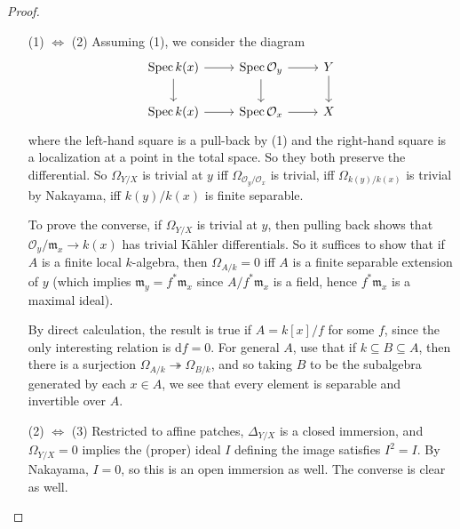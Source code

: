 \documentclass{shortart}
\theoremstyle{definition}
\DeclareMathOperator\Spec{Spec}
\begin{document}
\begin{proof}\leavevmode
  \begin{itemize}[leftmargin=2cm]
    \item [(1) $\Leftrightarrow$ (2)] Assuming (1), we consider the diagram
      \[
        \begin{tikzcd}
          \Spec k(x) \ar[d] \ar[r] & \Spec \mathcal{O}_y \ar[r] \ar[d] & Y\ar[d] \\
          \Spec k(x) \ar[r] & \Spec \mathcal{O}_x \ar[r] & X
        \end{tikzcd}
      \]
      where the left-hand square is a pull-back by (1) and the right-hand square is a localization at a point in the total space. So they both preserve the differential. So $\Omega_{Y/X}$ is trivial at $y$ iff $\Omega_{\mathcal{O}_y/\mathcal{O}_x}$ is trivial, iff $\Omega_{k(y)/k(x)}$ is trivial by Nakayama, iff $k(y)/k(x)$ is finite separable.

      To prove the converse, if $\Omega_{Y/X}$ is trivial at $y$, then pulling back shows that $\mathcal{O}_y/\mathfrak{m}_x \to k(x)$ has trivial K\"ahler differentials. So it suffices to show that if $A$ is a finite local $k$-algebra, then $\Omega_{A/k} = 0$ iff $A$ is a finite separable extension of $y$ (which implies $\mathfrak{m}_y = f^* \mathfrak{m}_x$ since $A/f^*\mathfrak{m}_x$ is a field, hence $f^*\mathfrak{m}_x$ is a maximal ideal).
     
      By direct calculation, the result is true if $A = k[x]/f$ for some $f$, since the only interesting relation is $\mathrm{d} f = 0$. For general $A$, use that if $k \subseteq B \subseteq A$, then there is a surjection $\Omega_{A/k} \twoheadrightarrow \Omega_{B/k}$, and so taking $B$ to be the subalgebra generated by each $x \in A$, we see that every element is separable and invertible over $A$.

    \item [(2) $\Leftrightarrow$ (3)] Restricted to affine patches, $\Delta_{Y/X}$ is a closed immersion, and $\Omega_{Y/X} = 0$ implies the (proper) ideal $I$ defining the image satisfies $I^2 = I$. By Nakayama, $I = 0$, so this is an open immersion as well. The converse is clear as well.\qedhere
  \end{itemize}
\end{proof}
\end{document}
